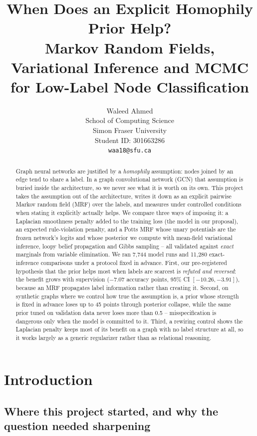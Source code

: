\documentclass{article}
\title{
When Does an Explicit Homophily Prior Help? \\
Markov Random Fields, Variational Inference and MCMC \\
for Low-Label Node Classification
}
\author{Waleed Ahmed \\
School of Computing Science \\
Simon Fraser University \\
Student ID: 301663286 \\
\texttt{waa18@sfu.ca}
}
\begin{document}
\maketitle
{}

\begin{abstract}
Graph neural networks are justified by a \emph{homophily} assumption: nodes joined by an edge
tend to share a label. In a graph convolutional network (GCN) that assumption is buried inside
the architecture, so we never see what it is worth on its own. This project takes the assumption
out of the architecture, writes it down as an explicit pairwise Markov random field (MRF) over
the labels, and measures under controlled conditions when stating it explicitly actually helps.
We compare three ways of imposing it: a Laplacian smoothness penalty added to the training loss
(the model in our proposal), an expected rule-violation penalty, and a Potts MRF whose unary
potentials are the frozen network's logits and whose posterior we compute with mean-field
variational inference, loopy belief propagation and Gibbs sampling -- all validated against
\emph{exact} marginals from variable elimination. We ran 7{,}744 model runs and 11{,}280
exact-inference comparisons under a protocol fixed in advance. First,
our pre-registered hypothesis that the prior helps most when labels are scarcest is
\emph{refuted and reversed}: the benefit grows with supervision ($-7.07$ accuracy points, 95\%
CI $[-10.26,-3.91]$), because an MRF propagates label information rather than creating it.
Second, on synthetic graphs where we control how true the assumption is, a prior whose strength
is fixed in advance loses up to 45 points through posterior collapse, while the same prior tuned
on validation data never loses more than 0.5 -- misspecification is dangerous only when the
model is committed to it. Third, a rewiring control shows the Laplacian penalty keeps most of
its benefit on a graph with no label structure at all, so it works largely as a generic
regularizer rather than as relational reasoning.
\end{abstract}

\section{Introduction}

\subsection{Where this project started, and why the question needed sharpening}
\end{document}
